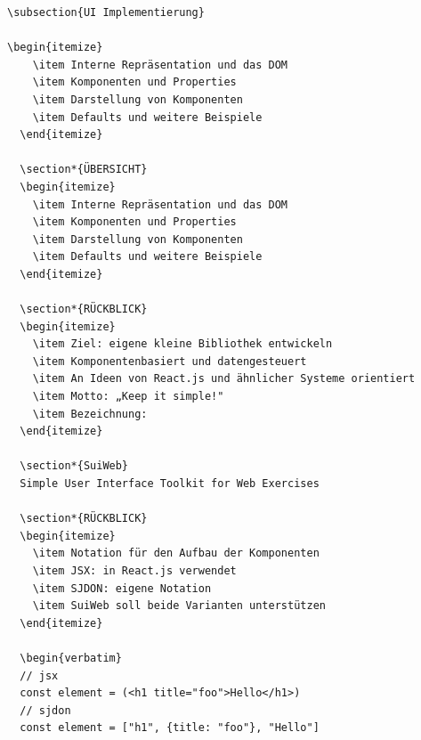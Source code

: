 \begin{verbatim}
\subsection{UI Implementierung}

\begin{itemize}
    \item Interne Repräsentation und das DOM
    \item Komponenten und Properties
    \item Darstellung von Komponenten
    \item Defaults und weitere Beispiele
  \end{itemize}
  
  \section*{ÜBERSICHT}
  \begin{itemize}
    \item Interne Repräsentation und das DOM
    \item Komponenten und Properties
    \item Darstellung von Komponenten
    \item Defaults und weitere Beispiele
  \end{itemize}
  
  \section*{RÜCKBLICK}
  \begin{itemize}
    \item Ziel: eigene kleine Bibliothek entwickeln
    \item Komponentenbasiert und datengesteuert
    \item An Ideen von React.js und ähnlicher Systeme orientiert
    \item Motto: „Keep it simple!"
    \item Bezeichnung:
  \end{itemize}
  
  \section*{SuiWeb}
  Simple User Interface Toolkit for Web Exercises
  
  \section*{RÜCKBLICK}
  \begin{itemize}
    \item Notation für den Aufbau der Komponenten
    \item JSX: in React.js verwendet
    \item SJDON: eigene Notation
    \item SuiWeb soll beide Varianten unterstützen
  \end{itemize}
  
  \begin{verbatim}
  // jsx
  const element = (<h1 title="foo">Hello</h1>)
  // sjdon
  const element = ["h1", {title: "foo"}, "Hello"]
  \end{verbatim}
  
